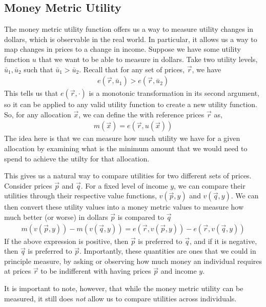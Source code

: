 \subsection*{Money Metric Utility}
The money metric utility function offers us a way to measure utility changes in dollars, which is observable in the real world. In particular, it allows us a way to map changes in prices to a change in income. Suppose we have some utility function $u$ that we want to be able to measure in dollars. Take two utility levels, $\bar{u}_1, \bar{u}_2$ such that $\bar{u}_1 > \bar{u}_2$. Recall that for any set of prices, $\vec{r}$, we have
\begin{align*}
    e(\vec{r}, \bar{u}_1) > e(\vec{r}, \bar{u}_2)
\end{align*}
This tells us that $e(\vec{r}, \cdot)$ is a monotonic transformation in its second argument, so it can be applied to any valid utility function to create a new utility function. So, for any allocation $\vec{x}$, we can define the  with reference prices $\vec{r}$ as,
\begin{align*}
    m(\vec{x}) = e(\vec{r}, u(\vec{x}))
\end{align*}
The idea here is that we can measure how much utility we have for a given allocation by examining what is the minimum amount that we would need to spend to achieve the utilty for that allocation. 

This gives us a natural way to compare utilities for two different sets of prices. Consider prices $\vec{p}$ and $\vec{q}$. For a fixed level of income $y$, we can compare their utilities through their respective value functions, $v(\vec{p}, y)$ and $v(\vec{q}, y)$. We can then convert these utility values into a money metric values to measure how much better (or worse) in dollars $\vec{p}$ is compared to $\vec{q}$
\begin{align*}
    m(v(\vec{p}, y)) - m(v(\vec{q}, y)) = e(\vec{r}, v(\vec{p}, y)) - e(\vec{r}, v(\vec{q}, y))
\end{align*}
If the above expression is positive, then $\vec{p}$ is preferred to $\vec{q}$, and if it is negative, then $\vec{q}$ is preferred to $\vec{p}$. Importantly, these quantities are ones that we could in principle measure, by asking or observing how much money an individual requires at prices $\vec{r}$ to be indifferent with having prices $\vec{p}$ and income $y$. 

It is important to note, however, that while the money metric utility can be measured, it still does \emph{not} allow us to compare utilities across individuals.

